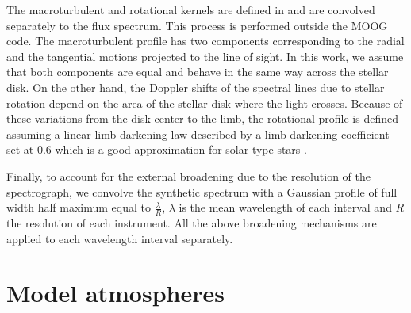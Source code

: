 \documentclass[fleqn,usenatbib]{mnras}
\begin{document}
The macroturbulent and rotational kernels are defined in \citet{Gray2005} and are convolved separately to the flux spectrum. This process is performed outside the MOOG code. 
The macroturbulent profile has two components corresponding to the radial and the tangential motions projected to the line of sight. In this work, we assume that both components are equal 
and behave in the same way across the stellar disk. 
On the other hand, the Doppler shifts of the spectral lines due to stellar rotation depend on the area of the stellar disk where the light crosses. 
Because of these variations from the disk center to the limb, the rotational profile is defined assuming a linear limb darkening law described by a limb darkening coefficient set at 0.6 
which is a good approximation for solar-type stars \citep[e.g.][]{gimenez2006}. 

Finally, to account for the external broadening due to the resolution of the spectrograph, we convolve the synthetic spectrum with a Gaussian profile of full width half maximum equal to 
$\frac{\lambda}{R}$, $\lambda$ is the mean wavelength of each interval and $R$ the resolution of each instrument. All the above broadening mechanisms are applied to each wavelength interval 
separately.

\section{Model atmospheres}\label{models}
\end{document}
